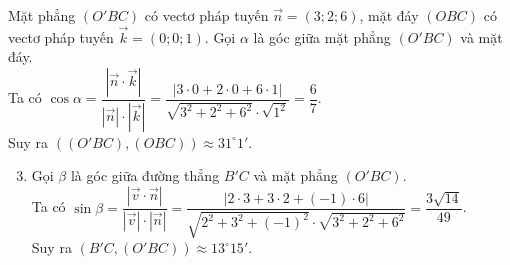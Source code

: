 \begin{vd}
{{
		}
		Mặt phẳng $(O'BC)$ có vectơ pháp tuyến $\overrightarrow{n}=(3;2;6)$, mặt đáy $(OBC)$ có vectơ pháp tuyến $\overrightarrow{k}=(0;0;1)$. Gọi $\alpha$ là góc giữa mặt phẳng $(O'BC)$ và mặt đáy.\\
		Ta có $\cos\alpha =\dfrac{\left |\overrightarrow{n}\cdot\overrightarrow{k} \right |}{\left |\overrightarrow{n} \right |\cdot\left |\overrightarrow{k} \right |}=\dfrac{\left |3\cdot 0+2\cdot 0+6\cdot 1 \right |}{\sqrt{3^2+2^2+6^2}\cdot\sqrt{1^2}}=\dfrac{6}{7}$.\\
		Suy ra $\left ((O'BC),(OBC) \right )\approx 31^{\circ}1'$.
		\begin{enumerate}
			\setcounter{enumi}{2}
			\item Gọi $\beta$ là góc giữa đường thẳng $B'C$ và mặt phẳng $(O'BC)$.\\
			Ta có $\sin\beta =\dfrac{\left |\overrightarrow{v}\cdot\overrightarrow{n} \right |}{\left |\overrightarrow{v} \right |\cdot\left |\overrightarrow{n} \right |}=\dfrac{\left |2\cdot 3+3\cdot 2+(-1)\cdot 6 \right |}{\sqrt{2^2+3^2+(-1)^2}\cdot\sqrt{3^2+2^2+6^2}}=\dfrac{3\sqrt{14}}{49}$.\\
			Suy ra $(B'C,(O'BC))\approx 13^{\circ}15'$.
		\end{enumerate}
	}
\end{vd}
